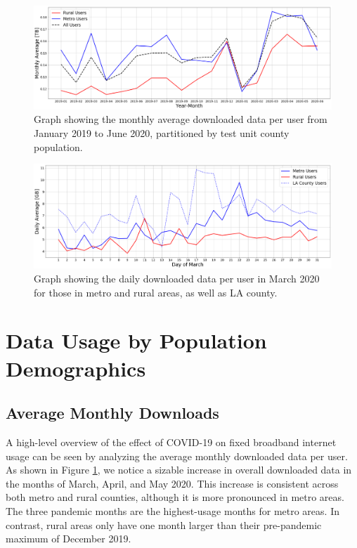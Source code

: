 \begin{figure}[t]
    \centering
    \includegraphics[width=1.0\linewidth]{figs/monthly_downloaded_data_notitle.png}
    \caption{Graph showing the monthly average downloaded data per user from January 2019 to June 2020, partitioned by test unit county population.}
    \label{fig:downloadmetro_rural}
\end{figure}

\begin{figure}[t]
    \centering
    \includegraphics[width=1.0\linewidth]{figs/daily_downloaded_data_notitle.png}
    \caption{Graph showing the daily downloaded data per user in March 2020 for those in metro and rural areas, as well as LA county.}
    \label{fig:dailymetro_rural}
\end{figure}

\section{Data Usage by Population Demographics}
\label{sec:data-usage-by-population-demographics}

\subsection{Average Monthly Downloads}

A high-level overview of the effect of COVID-19 on fixed broadband internet usage can be seen by analyzing the average monthly downloaded data per user. As shown in Figure \ref{fig:downloadmetro_rural}, we notice a sizable increase in overall downloaded data in the months of March, April, and May 2020. This increase is consistent across both metro and rural counties, although it is more pronounced in metro areas. The three pandemic months are the highest-usage months for metro areas. In contrast, rural areas only have one month larger than their pre-pandemic maximum of December 2019. 

